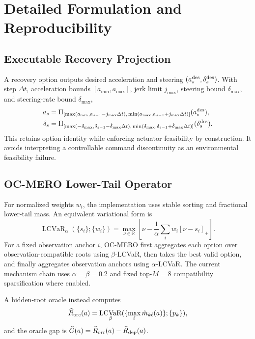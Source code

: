 \documentclass[conference]{IEEEtran}
\DeclareMathOperator{\LCVaR}{LCVaR}
\begin{document}
\appendices
\section{Detailed Formulation and Reproducibility}
\label{sec:appendix}

\subsection{Executable Recovery Projection}
A recovery option outputs desired acceleration and steering $(a_s^{\rm des},\delta_s^{\rm des})$. With step $\Delta t$, acceleration bounds $[a_{\min},a_{\max}]$, jerk limit $j_{\max}$, steering bound $\delta_{\max}$, and steering-rate bound $\dot\delta_{\max}$,
\begin{align}
 a_s &= \Pi_{[\max(a_{\min},a_{s-1}-j_{\max}\Delta t),\,\min(a_{\max},a_{s-1}+j_{\max}\Delta t)]}(a_s^{\rm des}),\\
 \delta_s &= \Pi_{[\max(-\delta_{\max},\delta_{s-1}-\dot\delta_{\max}\Delta t),\,\min(\delta_{\max},\delta_{s-1}+\dot\delta_{\max}\Delta t)]}(\delta_s^{\rm des}).
\end{align}
This retains option identity while enforcing actuator feasibility by construction. It avoids interpreting a controllable command discontinuity as an environmental feasibility failure.

\subsection{OC-MERO Lower-Tail Operator}
For normalized weights $w_i$, the implementation uses stable sorting and fractional lower-tail mass. An equivalent variational form is
\begin{equation}
 \LCVaR_{\alpha}(\{s_i\};\{w_i\})=\max_{\nu\in\mathbb R}\left[\nu-\frac{1}{\alpha}\sum_iw_i[\nu-s_i]_+\right].
\end{equation}
For a fixed observation anchor $i$, OC-MERO first aggregates each option over observation-compatible roots using $\beta$-LCVaR, then takes the best valid option, and finally aggregates observation anchors using $\alpha$-LCVaR. The current mechanism chain uses $\alpha=\beta=0.2$ and fixed top-$M=8$ compatibility sparsification where enabled.

A hidden-root oracle instead computes
\begin{equation}
 \widehat R_{\rm orc}(a)=\LCVaR_{\beta}(\{\max_\ell \hat m_{k\ell}(a)\};\{p_k\}),
\end{equation}
and the oracle gap is $\widehat G(a)=\widehat R_{\rm orc}(a)-\widehat R_{\rm dep}(a)$.
\end{document}
